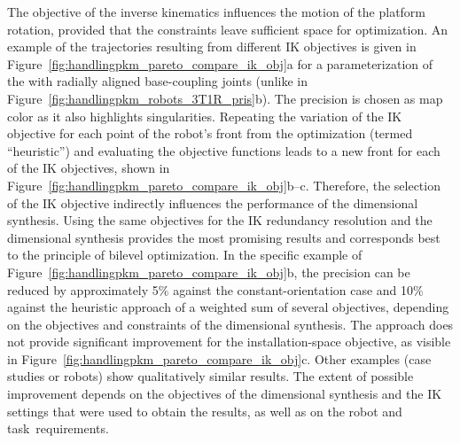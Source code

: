 The objective of the inverse kinematics influences the motion of the platform rotation, provided that the constraints leave sufficient space for optimization.
An example of the trajectories resulting from different IK objectives is given in Figure~\ref{fig:handlingpkm_pareto_compare_ik_obj}a for a parameterization of the  with radially aligned base-coupling joints (unlike in Figure~\ref{fig:handlingpkm_robots_3T1R_pris}b).
The precision is chosen as map color as it also highlights singularities.
Repeating the variation of the IK objective for each point of the robot's  front from the optimization (termed ``heuristic'') and evaluating the objective functions leads to a new  front for each of the IK objectives, shown in Figure~\ref{fig:handlingpkm_pareto_compare_ik_obj}b--c.
Therefore, the selection of the IK objective indirectly influences the performance of the dimensional synthesis.
Using the same objectives for the IK redundancy resolution and the dimensional synthesis provides the most promising results and corresponds best to the principle of bilevel optimization.
In the specific example of Figure~\ref{fig:handlingpkm_pareto_compare_ik_obj}b, the precision can be reduced by approximately 5\% against the constant-orientation case and 10\% against the heuristic approach of a weighted sum of several objectives, depending on the objectives and constraints of the dimensional synthesis.
The approach does not provide significant improvement for the installation-space objective, as visible in Figure~\ref{fig:handlingpkm_pareto_compare_ik_obj}c.
Other examples (case studies or robots) show qualitatively similar results.
The extent of possible improvement depends on the objectives of the dimensional synthesis and the IK settings that were used to obtain the results, as well as on the robot and task~requirements.

